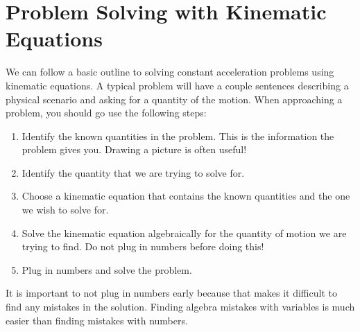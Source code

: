 \documentclass[12pt]{book}
\begin{document}
\newpage


\section{Problem Solving with Kinematic Equations}

We can follow a basic outline to solving constant acceleration problems using kinematic equations. A typical problem will have a couple sentences describing a physical scenario and asking for a quantity of the motion. When approaching a problem, you should go use the following steps:

\begin{enumerate}
\item Identify the known quantities in the problem. This is the information the problem gives you. Drawing a picture is often useful!

\item Identify the quantity that we are trying to solve for.

\item Choose a kinematic equation that contains the known quantities and the one we wish to solve for.

\item Solve the kinematic equation algebraically for the quantity of motion we are trying to find. Do not plug in numbers before doing this!

\item Plug in numbers and solve the problem.
\end{enumerate}

It is important to not plug in numbers early because that makes it difficult to find any mistakes in the solution. Finding algebra mistakes with variables is much easier than finding mistakes with numbers.
\end{document}
